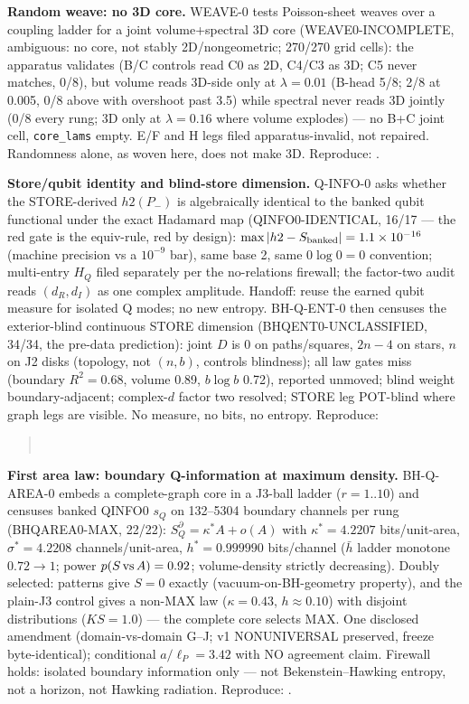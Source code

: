 \documentclass[11pt]{article}
\begin{document}
\textbf{Random weave: no 3D core.} WEAVE-0 tests Poisson-sheet weaves over
a coupling ladder for a joint volume+spectral 3D core
(WEAVE0-INCOMPLETE, ambiguous: no core, not stably 2D/nongeometric;
270/270 grid cells): the apparatus validates (B/C controls read C0 as
2D, C4/C3 as 3D; C5 never matches, 0/8), but volume reads 3D-side only
at $\lambda = 0.01$ (B-head 5/8; 2/8 at 0.005, 0/8 above with overshoot
past 3.5) while spectral never reads 3D jointly (0/8 every rung;
3D only at $\lambda = 0.16$ where volume explodes) --- no B+C joint
cell, \texttt{core\_lams} empty. E/F and H legs filed
apparatus-invalid, not repaired. Randomness alone, as woven here, does
not make 3D.
Reproduce: .

\textbf{Store/qubit identity and blind-store dimension.} Q-INFO-0 asks
whether the STORE-derived $h2(P_-)$ is algebraically identical to the
banked qubit functional under the exact Hadamard map
(QINFO0-IDENTICAL, 16/17 --- the red gate is the equiv-rule, red by
design): $\max|h2 - S_{\rm banked}| = 1.1\times10^{-16}$ (machine
precision vs a $10^{-9}$ bar), same base 2, same $0\log0 = 0$
convention; multi-entry $H_Q$ filed separately per the no-relations
firewall; the factor-two audit reads $(d_R, d_I)$ as one complex
amplitude. Handoff: reuse the earned qubit measure for isolated Q
modes; no new entropy. BH-Q-ENT-0 then censuses the exterior-blind
continuous STORE dimension (BHQENT0-UNCLASSIFIED, 34/34, the pre-data
prediction): joint $D$ is 0 on paths/squares, $2n{-}4$ on stars, $n$
on J2 disks (topology, not $(n,b)$, controls blindness); all law
gates miss (boundary $R^2 = 0.68$, volume 0.89, $b\log b$ 0.72),
reported unmoved; blind weight boundary-adjacent; complex-$d$ factor
two resolved; STORE leg POT-blind where graph legs are visible. No
measure, no bits, no entropy.
Reproduce:
\begin{quote}\small
{}\\
\end{quote}

\textbf{First area law: boundary Q-information at maximum density.}
BH-Q-AREA-0 embeds a complete-graph core in a J3-ball ladder
($r = 1..10$) and censuses banked QINFO0 $s_Q$ on 132--5304 boundary
channels per rung (BHQAREA0-MAX, 22/22): $S_Q^\partial = \kappa^* A +
o(A)$ with $\kappa^* = 4.2207$ bits/unit-area, $\sigma^* = 4.2208$
channels/unit-area, $h^* = 0.999990$ bits/channel ($\bar h$ ladder
monotone $0.72 \to 1$; power $p(S\,{\rm vs}\,A) = 0.92$;
volume-density strictly decreasing). Doubly selected: patterns give
$S = 0$ exactly (vacuum-on-BH-geometry property), and the plain-J3
control gives a non-MAX law ($\kappa = 0.43$, $h \approx 0.10$) with
disjoint distributions ($KS = 1.0$) --- the complete core selects MAX.
One disclosed amendment (domain-vs-domain G--J; v1 NONUNIVERSAL
preserved, freeze byte-identical); conditional $a/\ell_P = 3.42$ with
NO agreement claim. Firewall holds: isolated boundary information
only --- not Bekenstein--Hawking entropy, not a horizon, not Hawking
radiation.
Reproduce: .
\end{document}

